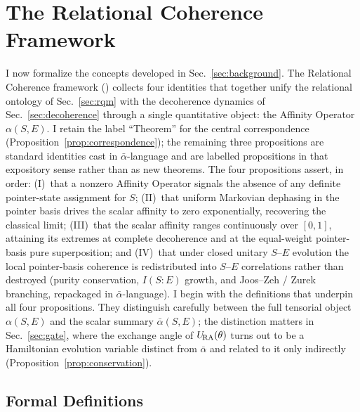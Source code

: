 %

\section{\label{sec:rct}The Relational Coherence Framework}

I now formalize the concepts developed in Sec.~\ref{sec:background}.
The Relational Coherence framework (\RCF) collects four
identities that together unify the relational ontology of
Sec.~\ref{sec:rqm} with the decoherence dynamics of
Sec.~\ref{sec:decoherence} through a single quantitative object:
the Affinity Operator $\alpha(S,E)$.
I retain the label ``Theorem'' for the central
correspondence (Proposition~\ref{prop:correspondence}); the
remaining three propositions are standard identities cast in
$\bar\alpha$-language and are labelled propositions in that
expository sense rather than as new theorems.
The four propositions assert, in order: (I)~that a nonzero Affinity
Operator signals the absence of any definite pointer-state assignment
for $S$; (II)~that uniform Markovian dephasing in the pointer basis
drives the scalar affinity to zero exponentially, recovering the
classical limit; (III)~that the scalar affinity ranges continuously
over $[0,1]$, attaining its extremes at complete decoherence and at
the equal-weight pointer-basis pure superposition; and (IV)~that under
closed unitary $S$--$E$ evolution the local pointer-basis coherence is
redistributed into $S$--$E$ correlations rather than destroyed
(purity conservation, $I(S{:}E)$ growth, and Joos--Zeh / Zurek
branching, repackaged in $\bar\alpha$-language).
I begin with the definitions that underpin all four propositions. They distinguish carefully between the full tensorial object $\alpha(S,E)$ and the scalar summary $\bar{\alpha}(S,E)$; the distinction matters in Sec.~\ref{sec:gate}, where the exchange angle of $U_{\!\mathrm{RA}}(\theta)$ turns out to be a Hamiltonian evolution variable distinct from $\bar{\alpha}$ and related to it only indirectly (Proposition~\ref{prop:conservation}).


\subsection{\label{sec:definitions}Formal Definitions}

